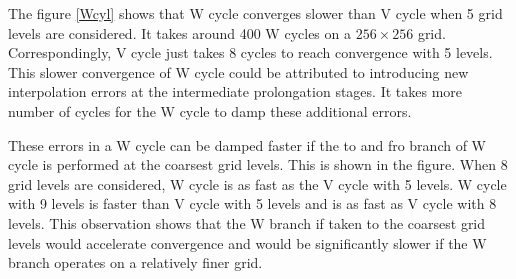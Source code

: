 \documentclass[11pt]{report}
\begin{document}
The figure \ref{Wcyl} shows that W cycle converges slower than V cycle when 5 grid levels are considered. It takes around 400 W cycles on a $256\times256$ grid. Correspondingly, V cycle just takes  8 
cycles to reach convergence with 5 levels. This slower convergence of W cycle could be attributed to introducing new interpolation errors at the intermediate prolongation stages. It takes more number of cycles for the W cycle to 
damp these additional errors. 

These errors in a W cycle can be  damped faster if the to and fro branch of W cycle is performed at the coarsest grid levels. This is shown in the figure. When 8 grid levels are considered, W 
cycle is as fast as the V cycle with 5 levels. W cycle with 9 levels is faster than V cycle with 5 levels and is as fast as V cycle with 8 levels. This observation shows that the W branch if taken to the coarsest grid levels would accelerate convergence and would be significantly slower if the W branch operates on a relatively finer grid.
\end{document}
